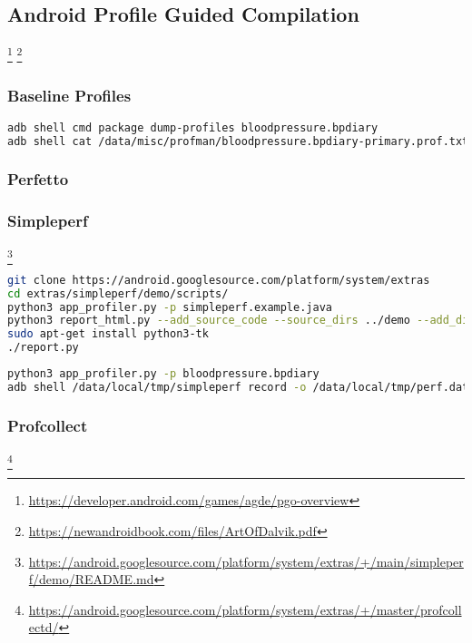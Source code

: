 \subsection{Android Profile Guided Compilation}
\label{task:20231127_memdump}

\footnote{\url{https://developer.android.com/games/agde/pgo-overview}}
\footnote{\url{https://newandroidbook.com/files/ArtOfDalvik.pdf}}

\subsubsection{Baseline Profiles}
\begin{lstlisting}[language=bash]
adb shell cmd package dump-profiles bloodpressure.bpdiary
adb shell cat /data/misc/profman/bloodpressure.bpdiary-primary.prof.txt > bpdiary_profile.txt
\end{lstlisting}

\subsubsection{Perfetto}


\subsubsection{Simpleperf}\footnote{\url{https://android.googlesource.com/platform/system/extras/+/main/simpleperf/demo/README.md}}


\begin{lstlisting}[language=bash]
git clone https://android.googlesource.com/platform/system/extras
cd extras/simpleperf/demo/scripts/
python3 app_profiler.py -p simpleperf.example.java
python3 report_html.py --add_source_code --source_dirs ../demo --add_disassembly
sudo apt-get install python3-tk
./report.py
\end{lstlisting}

\begin{lstlisting}[language=bash]
python3 app_profiler.py -p bloodpressure.bpdiary
adb shell /data/local/tmp/simpleperf record -o /data/local/tmp/perf.data -e task-clock:u -f 1000 -g --duration 10 --log info --app bloodpressure.bpdiary
\end{lstlisting}

\subsubsection{Profcollect}
\footnote{\url{https://android.googlesource.com/platform/system/extras/+/master/profcollectd/}}

